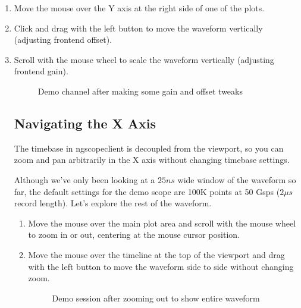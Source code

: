\begin{enumerate}
\item Move the mouse over the Y axis at the right side of one of the plots.
\item Click and drag with the left button to move the waveform vertically (adjusting frontend offset).
\item Scroll with the mouse wheel to scale the waveform vertically (adjusting frontend gain).

\begin{figure}[h]
\centering
{}
\caption{Demo channel after making some gain and offset tweaks}
\label{basic-moved}
\end{figure}

\subsection{Navigating the X Axis}

The timebase in ngscopeclient is decoupled from the viewport, so you can zoom and pan arbitrarily in the X axis without
changing timebase settings.

Although we've only been looking at a $25 ns$ wide window of the waveform so far, the default settings for the demo scope
are 100K points at 50 Gsps ($2 \mu s$ record length). Let's explore the rest of the waveform.

\begin{enumerate}
\item Move the mouse over the main plot area and scroll with the mouse wheel to zoom in or out, centering at the mouse
cursor position.
\item Move the mouse over the timeline at the top of the viewport and drag with the left button to move the waveform
side to side without changing zoom.

\begin{figure}[h]
\centering
{}
\caption{Demo session after zooming out to show entire waveform}
\label{basic-zoomed}
\end{figure}

\end{enumerate}

\end{enumerate}

